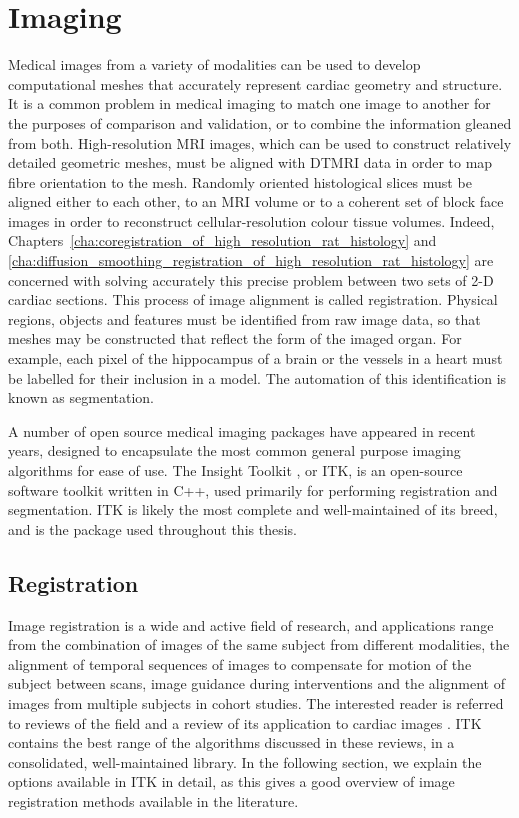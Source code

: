 \section{Imaging}
\label{imaging}
  Medical images from a variety of modalities can be used to develop computational meshes that accurately represent cardiac geometry and structure. It is a common problem in medical imaging to match one image to another for the purposes of comparison and validation, or to combine the information gleaned from both. High-resolution MRI images, which can be used to construct relatively detailed geometric meshes, must be aligned with DTMRI data in order to map fibre orientation to the mesh. Randomly oriented histological slices must be aligned either to each other, to an MRI volume or to a coherent set of block face images in order to reconstruct cellular-resolution colour tissue volumes. Indeed, Chapters~\ref{cha:coregistration_of_high_resolution_rat_histology} and \ref{cha:diffusion_smoothing_registration_of_high_resolution_rat_histology} are concerned with solving accurately this precise problem between two sets of 2-D cardiac sections. This process of image alignment is called registration. Physical regions, objects and features must be identified from raw image data, so that meshes may be constructed that reflect the form of the imaged organ. For example, each pixel of the hippocampus of a brain or the vessels in a heart must be labelled for their inclusion in a model. The automation of this identification is known as segmentation.
  
  A number of open source medical imaging packages have appeared in recent years, designed to encapsulate the most common general purpose imaging algorithms for ease of use. The Insight Toolkit \cite{Yoo2002}, or ITK, is an open-source software toolkit written in C++, used primarily for performing registration and segmentation. ITK is likely the most complete and well-maintained of its breed, and is the package used throughout this thesis.
  
  \subsection{Registration} %
  \label{sub:registration}
    Image registration is a wide and active field of research, and applications range from the combination of images of the same subject from different modalities, the alignment of temporal sequences of images to compensate for motion of the subject between scans, image guidance during interventions and the alignment of images from multiple subjects in cohort studies. The interested reader is referred to reviews of the field \cite{Maintz1998,Hill2001,Zitova2003} and a review of its application to cardiac images \cite{Makela2002}. ITK contains the best range of the algorithms discussed in these reviews, in a consolidated, well-maintained library. In the following section, we explain the options available in ITK in detail, as this gives a good overview of image registration methods available in the literature.
  
